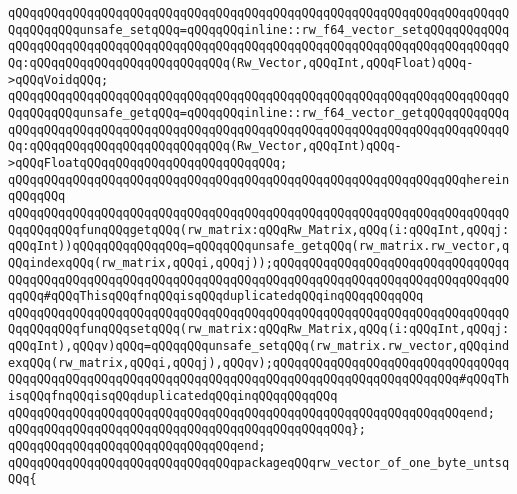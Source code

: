 \newline
\verb|qQQqqQQqqQQqqQQqqQQqqQQqqQQqqQQqqQQqqQQqqQQqqQQqqQQqqQQqqQQqqQQqqQQqqQQqqQQqqQQqunsafe_setqQQq=qQQqqQQqinline::rw_f64_vector_setqQQqqQQqqQQqqQQqqQQqqQQqqQQqqQQqqQQqqQQqqQQqqQQqqQQqqQQqqQQqqQQqqQQqqQQqqQQqqQQqqQQq:qQQqqQQqqQQqqQQqqQQqqQQqqQQq(Rw_Vector,qQQqInt,qQQqFloat)qQQq->qQQqVoidqQQq;|\newline
\verb|qQQqqQQqqQQqqQQqqQQqqQQqqQQqqQQqqQQqqQQqqQQqqQQqqQQqqQQqqQQqqQQqqQQqqQQqqQQqqQQqunsafe_getqQQq=qQQqqQQqinline::rw_f64_vector_getqQQqqQQqqQQqqQQqqQQqqQQqqQQqqQQqqQQqqQQqqQQqqQQqqQQqqQQqqQQqqQQqqQQqqQQqqQQqqQQqqQQq:qQQqqQQqqQQqqQQqqQQqqQQqqQQq(Rw_Vector,qQQqInt)qQQq->qQQqFloatqQQqqQQqqQQqqQQqqQQqqQQqqQQq;|\newline
\verb|qQQqqQQqqQQqqQQqqQQqqQQqqQQqqQQqqQQqqQQqqQQqqQQqqQQqqQQqqQQqqQQqhereinqQQqqQQq|\newline
\verb|qQQqqQQqqQQqqQQqqQQqqQQqqQQqqQQqqQQqqQQqqQQqqQQqqQQqqQQqqQQqqQQqqQQqqQQqqQQqqQQqfunqQQqgetqQQq(rw_matrix:qQQqRw_Matrix,qQQq(i:qQQqInt,qQQqj:qQQqInt))qQQqqQQqqQQqqQQq=qQQqqQQqunsafe_getqQQq(rw_matrix.rw_vector,qQQqindexqQQq(rw_matrix,qQQqi,qQQqj));qQQqqQQqqQQqqQQqqQQqqQQqqQQqqQQqqQQqqQQqqQQqqQQqqQQqqQQqqQQqqQQqqQQqqQQqqQQqqQQqqQQqqQQqqQQqqQQqqQQqqQQqqQQq#qQQqThisqQQqfnqQQqisqQQqduplicatedqQQqinqQQqqQQqqQQq|\newline
\verb|qQQqqQQqqQQqqQQqqQQqqQQqqQQqqQQqqQQqqQQqqQQqqQQqqQQqqQQqqQQqqQQqqQQqqQQqqQQqqQQqfunqQQqsetqQQq(rw_matrix:qQQqRw_Matrix,qQQq(i:qQQqInt,qQQqj:qQQqInt),qQQqv)qQQq=qQQqqQQqunsafe_setqQQq(rw_matrix.rw_vector,qQQqindexqQQq(rw_matrix,qQQqi,qQQqj),qQQqv);qQQqqQQqqQQqqQQqqQQqqQQqqQQqqQQqqQQqqQQqqQQqqQQqqQQqqQQqqQQqqQQqqQQqqQQqqQQqqQQqqQQqqQQqqQQqqQQq#qQQqThisqQQqfnqQQqisqQQqduplicatedqQQqinqQQqqQQqqQQq|\newline
\verb|qQQqqQQqqQQqqQQqqQQqqQQqqQQqqQQqqQQqqQQqqQQqqQQqqQQqqQQqqQQqqQQqend;|\newline
\verb|qQQqqQQqqQQqqQQqqQQqqQQqqQQqqQQqqQQqqQQqqQQqqQQq};|\newline
\verb|qQQqqQQqqQQqqQQqqQQqqQQqqQQqqQQqend;|\newline
\newline
\newline
\newline
\verb|qQQqqQQqqQQqqQQqqQQqqQQqqQQqqQQqpackageqQQqrw_vector_of_one_byte_untsqQQq{|\newline
